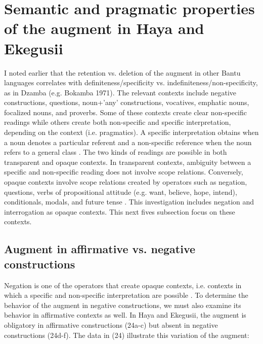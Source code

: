 \documentclass[output=paper]{langscibook}
\begin{document}
\section{Semantic and pragmatic properties of the augment in Haya and Ekegusii}\label{sec:choti:5}
I noted earlier that the retention vs. deletion of the augment in other Bantu languages correlates with definiteness/specificity vs. indefiniteness/non-specificity, as in Dzamba (e.g. Bokamba 1971). The relevant contexts include negative constructions, questions, noun+’any’ constructions, vocatives, emphatic nouns, focalized nouns, and proverbs. Some of these contexts create clear non-specific readings while others create both non-specific and specific interpretation, depending on the context (i.e. pragmatics). A specific interpretation obtains when a noun denotes a particular referent and a non-specific reference when the noun refers to a general class \citep[chapter 4]{lyons1999definiteness}. The two kinds of readings are possible in both transparent and opaque contexts. In transparent contexts, ambiguity between a specific and non-specific reading does not involve scope relations. Conversely, opaque contexts involve scope relations created by operators such as negation, questions, verbs of propositional attitude (e.g. want, believe, hope, intend), conditionals, modals, and future tense \citep[166-78]{lyons1999definiteness}. This investigation includes negation and interrogation as opaque contexts. This next fives subsection focus on these contexts.

\subsection{Augment in affirmative vs. negative constructions}\label{sec:choti:5.1}
Negation is one of the operators that create opaque contexts, i.e. contexts in which a specific and non-specific interpretation are possible \citep{lyons1999definiteness}. To determine the behavior of the augment in negative constructions, we must also examine its behavior in affirmative contexts as well. In Haya and Ekegusii, the augment is obligatory in affirmative constructions (24a-c) but absent in negative constructions (24d-f). The data in (24) illustrate this variation of the augment:
\end{document}
